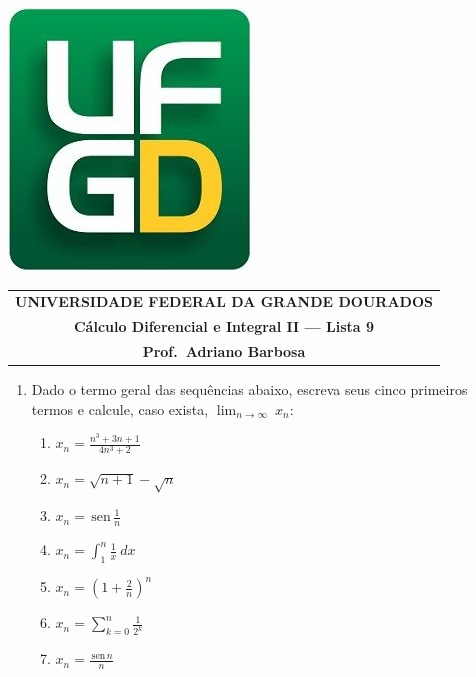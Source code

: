 \documentclass[a4paper,5pt]{amsbook}
\renewcommand{\sin}{\,\mbox{sen}\,}
\newcommand{\ds}{\displaystyle}
\begin{document}
\thispagestyle{empty}
\pagestyle{empty}
\begin{minipage}[h]{0.14\textwidth}
    \includegraphics[scale=0.24]{../../ufgd.png}
\end{minipage}
\begin{minipage}[h]{\textwidth}
    \begin{tabular}{c}
        {{\bf UNIVERSIDADE FEDERAL DA GRANDE DOURADOS}}\\
        {{\bf C\'{a}lculo Diferencial e Integral II --- Lista 9}}\\
        {{\bf Prof.\ Adriano Barbosa}}\\
    \end{tabular}
    \vspace{-0.45cm}
\end{minipage}


\vspace{1cm}
\begin{enumerate}
    \vspace{0.5cm}
    \item Dado o termo geral das sequ\^encias abaixo, escreva seus cinco
    primeiros termos e calcule, caso exista,
    $\displaystyle\lim_{n\rightarrow\infty}\ x_n$:
        \begin{enumerate}
        \setlength\itemsep{0.2cm}
        \item $x_n = \ds\frac{n^3+3n+1}{4n^3+2}$
        \item $x_n = \sqrt{n+1}-\sqrt{n}$
        \item $x_n = \ds\sin\frac{1}{n}$
        \item $x_n = \ds\int_1^n \frac{1}{x}\ dx$
        \item $x_n = \ds{\left(1+\frac{2}{n}\right)}^n$
        \item $x_n = \ds\sum_{k=0}^n \frac{1}{2^k}$
        \item $x_n = \ds\frac{\sin n}{n}$
        \end{enumerate}
\end{enumerate}
\end{document}
